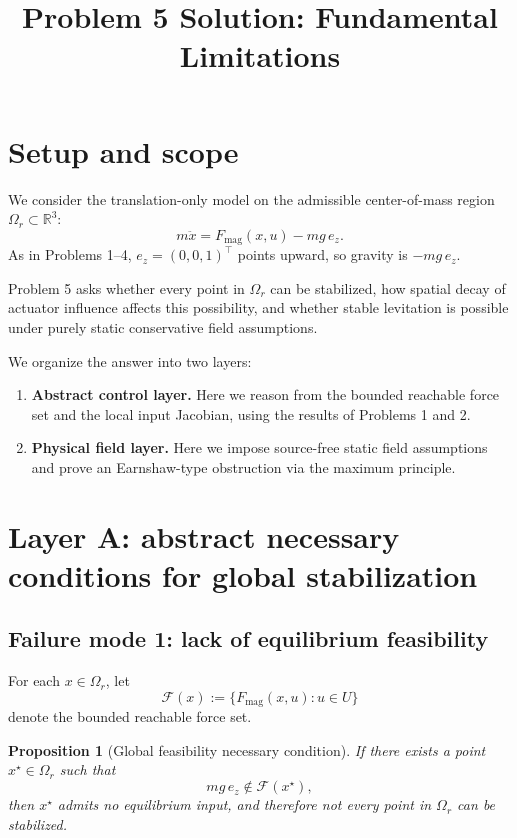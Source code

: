 \documentclass[11pt]{article}
\title{\textbf{Problem 5 Solution: Fundamental Limitations}}
\author{}
\date{}
\newtheorem{proposition}{Proposition}
\theoremstyle{definition}
\begin{document}
\maketitle

\section{Setup and scope}

We consider the translation-only model on the admissible center-of-mass region $\Omega_r \subset \mathbb{R}^3$:
\begin{equation}
 m\ddot x = F_{\mathrm{mag}}(x,u) - mg\,e_z.
 \label{eq:plant}
\end{equation}
As in Problems 1--4, $e_z=(0,0,1)^\top$ points upward, so gravity is $-mg\,e_z$.

Problem 5 asks whether every point in $\Omega_r$ can be stabilized, how spatial decay of actuator influence affects this possibility, and whether stable levitation is possible under purely static conservative field assumptions.

We organize the answer into two layers:
\begin{enumerate}[label=\textbf{Layer \arabic*:}, leftmargin=1.5em]
    \item \textbf{Abstract control layer.} Here we reason from the bounded reachable force set and the local input Jacobian, using the results of Problems 1 and 2.
    \item \textbf{Physical field layer.} Here we impose source-free static field assumptions and prove an Earnshaw-type obstruction via the maximum principle.
\end{enumerate}

\section{Layer A: abstract necessary conditions for global stabilization}

\subsection{Failure mode 1: lack of equilibrium feasibility}

For each $x\in\Omega_r$, let
\[
\mathcal{F}(x):=\{F_{\mathrm{mag}}(x,u):u\in U\}
\]
denote the bounded reachable force set.

\begin{proposition}[Global feasibility necessary condition]
If there exists a point $x^\star\in\Omega_r$ such that
\begin{equation}
 mg\,e_z \notin \mathcal{F}(x^\star),
 \label{eq:not_feasible}
\end{equation}
then $x^\star$ admits no equilibrium input, and therefore not every point in $\Omega_r$ can be stabilized.
\end{proposition}
\end{document}
